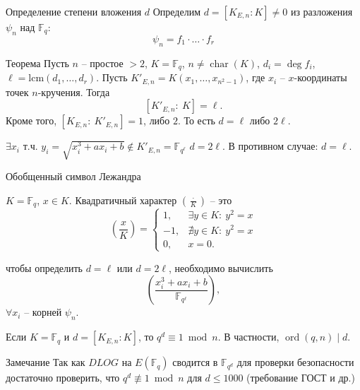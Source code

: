 \documentclass{beamer}
\begin{document}
\begin{frame}{Определение степени вложения $d$}
Определим $d = [K_{E,n} : K] \ne 0$ из разложения $\psi_n$ над $\mathbb{F}_q$: 
\[\psi_n = f_1 \cdot \ldots \cdot f_r\]
\begin{block}{Теорема}
Пусть $n$ -- простое $> 2$, $K = \mathbb{F}_q$, $n \ne \operatorname{char}(K)$,
$d_i = \deg {f_i}$,
$\ell = \mathrm{lcm}(d_1, \ldots, d_r)$.
Пусть $K'_{E,n} = K( {{x_1}, \ldots, {x_{{n^2} - 1}}})$, где ${x_i}$ -- $x$-координаты точек $n$-кручения. Тогда 
    \[[ {K'_{E,n}:\:K} ] = \ell.
    \]
    Кроме того, $[ {{K_{E,n}}:\:K'_{E,n}} ] = 1$, либо $2$. То есть $d = \ell$ либо $2\ell$. 
\end{block}

\structure{$\triangleleft$}
    $\exists x_i$ т.ч. $y_i = \sqrt{x_i^3 + a x_i + b} \not\in K'_{E,n} = \mathbb{F}_{q^\ell}$ \structure{$\implies$} $d = 2 \ell$.
    В противном случае: $d = \ell$.
\structure{$\triangleright$}
\end{frame}

\begin{frame}{Обобщенный символ Лежандра}
\begin{definition}
    $K = \mathbb{F}_q$, $x \in K$. Квадратичный характер $\left( \frac{ \cdot }{K} \right)$ -- это 
    $$
    \left( \frac{x}{K} \right ) =
    \begin{cases}
        1,& \exists y \in K:\:{y^2} = x \\
        -1,& \nexists y \in K:\:{y^2} = x \\
        0, & x = 0.
    \end{cases}
    $$
\end{definition}
\begin{center}
\structure{$\Downarrow$}
\end{center}
чтобы определить $d = \ell$ или $d = 2\ell$, необходимо вычислить 
\[
\left(  {\frac{x_i^3 + a{x_i} + b}{\mathbb{F}_{q^\ell}}} \right ),
\]
$\forall x_i$ -- корней $\psi_n$. 
\end{frame}

\begin{frame}
\begin{lemma}
Если $K = \mathbb{F}_q$ и $d = [K_{E,n} : K]$, то $q^d \equiv 1 \bmod{n}$. В частности, $\operatorname{ord}(q,n) \mid d$.
\end{lemma}

\vspace*{1em}
\begin{block}{Замечание}
Так как $DLOG$ на $E(\mathbb{F}_q)$ сводится в $\mathbb{F}_{q^d}$ для проверки безопасности достаточно проверить, что $q^d \not\equiv 1 \bmod{n}$ для $d \leq 1000$ (требование ГОСТ и др.)
\end{block}
\end{frame}
\end{document}
